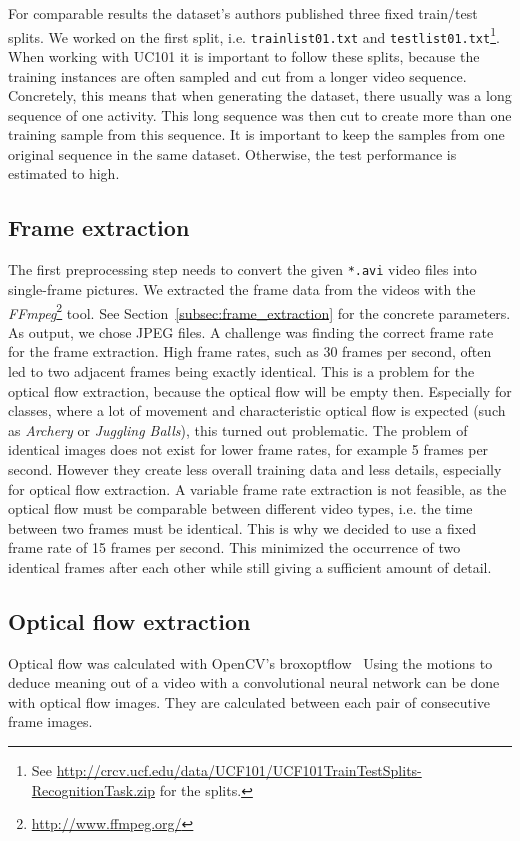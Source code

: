 For comparable results the dataset's authors published three fixed train/test splits.
We worked on the first split, i.e. \texttt{trainlist01.txt} and \texttt{testlist01.txt}\footnote{See \url{http://crcv.ucf.edu/data/UCF101/UCF101TrainTestSplits-RecognitionTask.zip} for the splits.}.
When working with UC101 it is important to follow these splits, because the training instances are often sampled and cut from a longer video sequence.
Concretely, this means that when generating the dataset, there usually was a long sequence of one activity.
This long sequence was then cut to create more than one training sample from this sequence.
It is important to keep the samples from one original sequence in the same dataset.
Otherwise, the test performance is estimated to high.

\subsection{Frame extraction}
The first preprocessing step needs to convert the given \texttt{*.avi} video files into single-frame pictures.
We extracted the frame data from the videos with the \emph{FFmpeg}\footnote{\url{http://www.ffmpeg.org/}} tool.
See Section~\ref{subsec:frame_extraction} for the concrete parameters.
As output, we chose JPEG files.
A challenge was finding the correct frame rate for the frame extraction.
High frame rates, such as 30 frames per second, often led to two adjacent frames being exactly identical.
This is a problem for the optical flow extraction, because the optical flow will be empty then.
Especially for classes, where a lot of movement and characteristic optical flow is expected (such as \emph{Archery} or \emph{Juggling Balls}), this turned out problematic.
The problem of identical images does not exist for lower frame rates, for example 5 frames per second.
However they create less overall training data and less details, especially for optical flow extraction.
A variable frame rate extraction is not feasible, as the optical flow must be comparable between different video types, i.e. the time between two frames must be identical.
This is why we decided to use a fixed frame rate of 15  frames per second.
This minimized the occurrence of two identical frames after each other while still giving a sufficient amount of detail.

\subsection{Optical flow extraction}
Optical flow was calculated with OpenCV's broxoptflow~\cite{brox2004high}
Using the motions to deduce meaning out of a video with a convolutional neural network can be done with optical flow images.
They are calculated between each pair of consecutive frame images.

